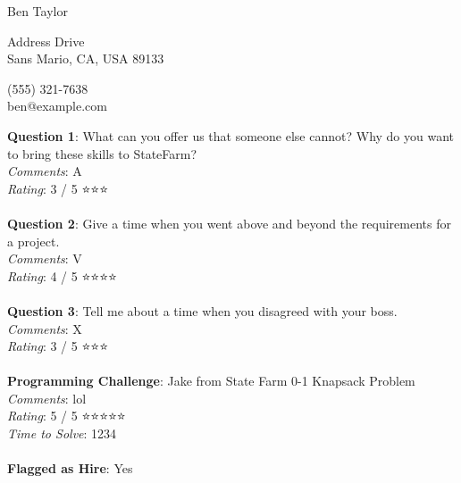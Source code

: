 \documentclass[12pt]{article}
\begin{document}
{\LARGE \begin{center}Ben Taylor\end{center}}

\begin{multicols}{2}
 Address Drive \\
Sans Mario, CA, USA 89133
\columnbreak

\noindent
(555) 321-7638 \\
ben@example.com
\end{multicols}

\noindent
\textbf{Question 1}: What can you offer us that someone else cannot? Why do you want to bring these skills to StateFarm?
\\\noindent
\textit{Comments}: A
\\\noindent
\textit{Rating}: 3 / 5 ⭐️⭐️⭐️
\\\\
\noindent
\textbf{Question 2}: Give a time when you went above and beyond the requirements for a project.
\\\noindent
\textit{Comments}: V
\\\noindent
\textit{Rating}: 4 / 5 ⭐️⭐️⭐️⭐️
\\\\
\noindent
\textbf{Question 3}: Tell me about a time when you disagreed with your boss.
\\\noindent
\textit{Comments}: X
\\\noindent
\textit{Rating}: 3 / 5 ⭐️⭐️⭐️
\\\\
\noindent
\textbf{Programming Challenge}: Jake from State Farm 0-1 Knapsack Problem
\\\noindent
\textit{Comments}: lol
\\\noindent
\textit{Rating}: 5 / 5 ⭐️⭐️⭐️⭐️⭐️
\\\noindent
\textit{Time to Solve}: 1234
\\\\
\textbf{Flagged as Hire}: Yes
\\\\ 
\end{document}
